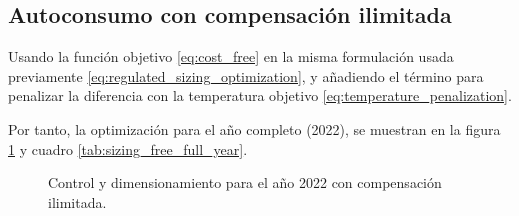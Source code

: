 \clearpage
\subsection{Autoconsumo con compensación ilimitada}

Usando la función objetivo \eqref{eq:cost_free} en la misma formulación usada
previamente \eqref{eq:regulated_sizing_optimization}, y añadiendo el término
para penalizar la diferencia con la temperatura objetivo
\eqref{eq:temperature_penalization}.

Por tanto, la optimización para el año completo (2022), se muestran en la
figura \ref{fig:sizing_free_full_year} y cuadro \ref{tab:sizing_free_full_year}.

\begin{figure}[h] \centering
	\centering
	
	\caption{Control y dimensionamiento para el año 2022 con compensación ilimitada.}
	\label{fig:sizing_free_full_year}
\end{figure}

